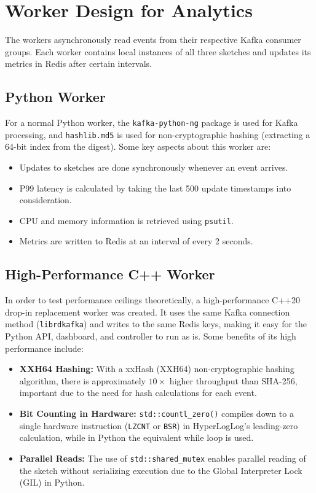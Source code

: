 \section{Worker Design for Analytics}

The workers asynchronously read events from their respective Kafka consumer groups. Each worker contains local instances of all three sketches and updates its metrics in Redis after certain intervals.

\subsection{Python Worker}
For a normal Python worker, the \texttt{kafka-python-ng} package is used for Kafka processing, and \texttt{hashlib.md5} is used for non-cryptographic hashing (extracting a 64-bit index from the digest). Some key aspects about this worker are:
\begin{itemize}
    \item Updates to sketches are done synchronously whenever an event arrives.
    \item P99 latency is calculated by taking the last 500 update timestamps into consideration.
    \item CPU and memory information is retrieved using \texttt{psutil}.
    \item Metrics are written to Redis at an interval of every 2 seconds.
\end{itemize}

\subsection{High-Performance C++ Worker}
In order to test performance ceilings theoretically, a high-performance C++20 drop-in replacement worker was created. It uses the same Kafka connection method (\texttt{librdkafka}) and writes to the same Redis keys, making it easy for the Python API, dashboard, and controller to run as is. Some benefits of its high performance include:

\begin{itemize}
    \item \textbf{XXH64 Hashing:} With a xxHash (XXH64) non-cryptographic hashing algorithm, there is approximately $10\times$ higher throughput than SHA-256, important due to the need for hash calculations for each event.
    \item \textbf{Bit Counting in Hardware:} \texttt{std::countl\_zero()} compiles down to a single hardware instruction (\texttt{LZCNT} or \texttt{BSR}) in HyperLogLog's leading-zero calculation, while in Python the equivalent while loop is used.
   \item \textbf{Parallel Reads:} The use of \texttt{std::shared\_mutex} enables parallel reading of the sketch without serializing execution due to the Global Interpreter Lock (GIL) in Python.
\end{itemize}

